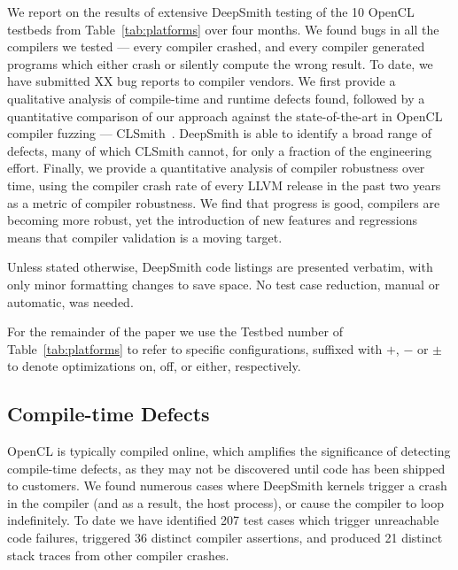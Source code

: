 We report on the results of extensive DeepSmith testing of the 10 OpenCL testbeds from Table~\ref{tab:platforms} over four months. We found bugs in all the compilers we tested --- every compiler crashed, and every compiler generated programs which either crash or silently compute the wrong result. To date, we have submitted XX bug reports to compiler vendors. We first provide a qualitative analysis of compile-time and runtime defects found, followed by a quantitative comparison of our approach against the state-of-the-art in OpenCL compiler fuzzing --- CLSmith~\cite{Lidbury2015a}. DeepSmith is able to identify a broad range of defects, many of which CLSmith cannot, for only a fraction of the engineering effort. Finally, we provide a quantitative analysis of compiler robustness over time, using the compiler crash rate of every LLVM release in the past two years as a metric of compiler robustness. We find that progress is good, compilers are becoming more robust, yet the introduction of new features and regressions means that compiler validation is a moving target.


Unless stated otherwise, DeepSmith code listings are presented verbatim, with only minor formatting changes to save space. No test case reduction, manual or automatic, was needed.


For the remainder of the paper we use the Testbed number of Table~\ref{tab:platforms} to refer to specific configurations, suffixed with $+$, $-$ or $\pm$ to denote optimizations on, off, or either, respectively.

\subsection{Compile-time Defects}%
\label{subsec:compile-time-defects}

OpenCL is typically compiled online, which amplifies the significance of detecting compile-time defects, as they may not be discovered until code has been shipped to customers. We found numerous cases where DeepSmith kernels trigger a crash in the compiler (and as a result, the host process), or cause the compiler to loop indefinitely. To date we have identified 207 test cases which trigger unreachable code failures, triggered 36 distinct compiler assertions, and produced 21 distinct stack traces from other compiler crashes.

